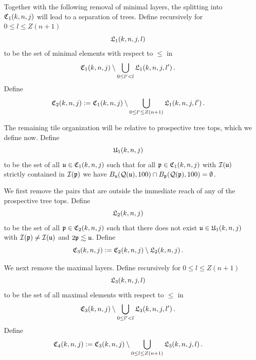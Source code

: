Together with the following removal of minimal layers, the splitting into ${\mathfrak C}_1(k,n,j)$ will lead to a separation of trees.
Define recursively for $0\le l\le Z(n+1)$
\begin{equation}
    \label{eq-L1-def}
    {\mathfrak L}_1(k,n,j,l)
\end{equation}
to be the set of minimal elements with respect to $\le$ in
\begin{equation}
    {\mathfrak C}_1(k,n,j)\setminus \bigcup_{0\le l'<l}
{\mathfrak L}_1(k,n,j,l')\, .
\end{equation}
Define
\begin{equation}
    \label{eq-C2-def}
    {\mathfrak C}_2(k,n,j):= {\mathfrak C}_1(k,n,j)\setminus \bigcup_{0\le l'\le Z(n+1)}
{\mathfrak L}_1(k,n,j,l')\, .
\end{equation}

The remaining tile organization will be relative to
prospective tree tops, which we define now.
Define
\begin{equation}\label{defunkj}
     {\mathfrak U}_1(k,n,j)
\end{equation}
to be the set of all
${\mathfrak u} \in {\mathfrak C}_1(k,n,j)$ such that
for all ${\mathfrak p} \in {\mathfrak C}_1(k,n,j)$
with ${\mathcal{I}}({\mathfrak u})$ strictly contained in
${\mathcal{I}}({\mathfrak p})$ we have $B_{{\mathfrak u}}({\mathcal{Q}}({\mathfrak u}), 100) \cap B_{{\mathfrak p}}({\mathcal{Q}}({\mathfrak p}),100) = \emptyset$.

We first remove the pairs that are outside the immediate reach of any of the prospective tree tops.
Define
\begin{equation}
\label{eq-L2-def}
{\mathfrak L}_2(k,n,j)
\end{equation}
to be the set of all ${\mathfrak p}\in {\mathfrak C}_2(k,n,j)$ such that there
does not exist
${\mathfrak u}\in {\mathfrak U}_1(k,n,j)$
with ${\mathcal{I}}({\mathfrak p})\neq {\mathcal{I}}({\mathfrak u})$ and $2{\mathfrak p}\lesssim {\mathfrak u}$.
Define
\begin{equation}
\label{eq-C3-def}
{\mathfrak C}_3(k,n,j):={\mathfrak C}_2(k,n,j)
  \setminus {\mathfrak L}_2(k,n,j)\, .
\end{equation}


We next remove the maximal layers.
Define recursively for $0 \le l \le Z(n+1)$
\begin{equation}
    \label{eq-L3-def}
    {\mathfrak L}_3(k,n,j,l)
\end{equation}
to be the set of all maximal elements with respect to $\le$ in
\begin{equation}
    {\mathfrak C}_3(k,n,j) \setminus \bigcup_{0 \le l' < l} {\mathfrak L}_3(k,n,j,l')\,.
\end{equation}
Define
\begin{equation}
\label{eq-C4-def}
{\mathfrak C}_4(k,n,j):={\mathfrak C}_3(k,n,j)
  \setminus \bigcup_{0 \le l \le Z(n+1)} {\mathfrak L}_3(k,n,j,l)\,.
\end{equation}

